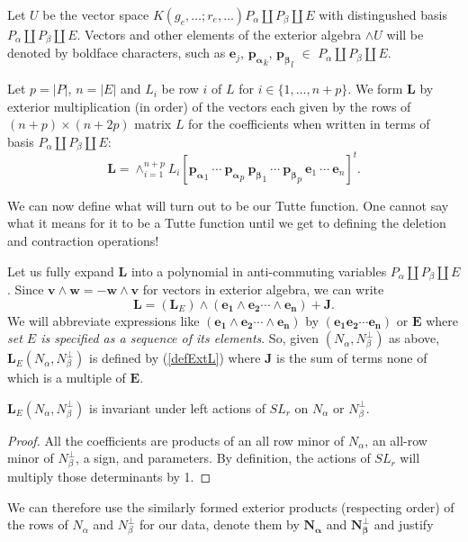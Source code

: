 \documentclass[Unicode]{cedram-alco}
\newcommand{\ext}[1]{\ensuremath{\mathbf{#1}}}
\newcommand{\dunion}{\coprod}
\begin{document}
Let $U$ be the vector space $K(g_e,\ldots;r_e,\ldots)P_\alpha
\dunion P_\beta \dunion E$ with distingushed basis $P_\alpha
\dunion P_\beta \dunion E$.  Vectors and other elements of the
exterior algebra $\wedge U$ will be denoted by boldface
characters, such as $\ext{e}_j$, $\ext{p_\alpha}_k$,
$\ext{p_\beta}_l$ $\in$ $P_\alpha \dunion P_\beta \dunion E$.
    
Let $p = |P|$, $n=|E|$ and $L_i$ be row $i$ of $L$ for $i\in\{1,\ldots,n+p\}$.
We form $\ext{L}$ by exterior multiplication (in order) of the vectors each given by the
rows of $(n+p)\times (n+2p)$ matrix $L$ for the coefficients when written in terms of
basis $P_\alpha \dunion P_\beta \dunion E$:
\begin{equation}\label{defExtL}
  \ext{L} = \wedge_{i=1}^{n+p}L_i[\ext{p_\alpha}_1\ \cdots\ \ext{p_\alpha}_{p}\ \ext{p_\beta}_1\ \cdots\ \ext{p_\beta}_{p}\
    \ext{e}_1\ \cdots\ \ext{e}_{n}]^t. 
\end{equation}

We can now define what will turn out to be our Tutte function.  One cannot say what it means for
it to be a Tutte function until we get to defining the deletion and contraction operations!

Let us fully expand $\ext{L}$ into a polynomial in anti-commuting variables
$P_\alpha \dunion P_\beta \dunion E$.  Since $\ext{v}\wedge\ext{w}=-\ext{w}\wedge\ext{v}$ for vectors in
exterior algebra, we can write
\[
\ext{L} = (\ext{L}_E)\wedge (\ext{e_1}\wedge\ext{e_2}\cdots\wedge\ext{e_n}) + \ext{J}.
\]
We will abbreviate expressions like $(\ext{e_1}\wedge\ext{e_2}\cdots\wedge\ext{e_n})$ by
$(\ext{e_1}\ext{e_2}\cdots\ext{e_n})$ or $\ext{E}$ where \emph{set $E$ is specified as a sequence of its elements}.
So, given $(N_\alpha,N_\beta^\perp)$ as above, $\ext{L}_E(N_\alpha,N_\beta^\perp)$ is defined by (\ref{defExtL}) where
$\ext{J}$ is the sum of terms none of which is a multiple of $\ext{E}$.

\begin{prop}
  $\ext{L}_E(N_\alpha,N_\beta^\perp)$ is invariant under left actions of $SL_r$ on $N_\alpha$ or $N_\beta^\perp$.
\end{prop}
\begin{proof}
  All the coefficients are products of an all row minor of $N_\alpha$, an all-row minor of $N_\beta^\perp$, a sign, and
  parameters.
  By definition, the actions of $SL_r$ will multiply those determinants by 1. 
\end{proof}

We can therefore use the similarly formed exterior products
(respecting order) of the rows of $N_\alpha$ and $N_\beta^\perp$
for our data, denote them by 
$\ext{N_\alpha}$ and $\ext{N_\beta^\perp}$
and justify
\end{document}
